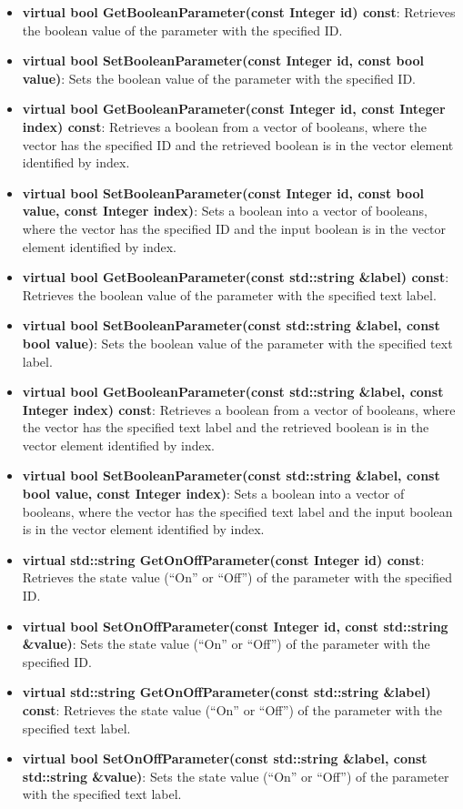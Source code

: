 \begin{itemize}
\item \textbf{virtual bool GetBooleanParameter(const Integer id) const}: Retrieves the boolean value
of the parameter with the specified ID.
\item \textbf{virtual bool SetBooleanParameter(const Integer id, const bool value)}: Sets the
boolean value of the parameter with the specified ID.
\item \textbf{virtual bool GetBooleanParameter(const Integer id, const Integer index) const}:
Retrieves a boolean from a vector of booleans, where the vector has the specified ID and the
retrieved boolean is in the vector element identified by index.
\item \textbf{virtual bool SetBooleanParameter(const Integer id, const bool value, const Integer
index)}: Sets a boolean into a vector of booleans, where the vector has the specified ID and
the input boolean is in the vector element identified by index.
\item \textbf{virtual bool GetBooleanParameter(const std::string \&label) const}: Retrieves the
boolean value of the parameter with the specified text label.
\item \textbf{virtual bool SetBooleanParameter(const std::string \&label, const bool value)}: Sets
the boolean value of the parameter with the specified text label.
\item \textbf{virtual bool GetBooleanParameter(const std::string \&label, const Integer index)
const}: Retrieves a boolean from a vector of booleans, where the vector has the specified text label
and the retrieved boolean is in the vector element identified by index.
\item \textbf{virtual bool SetBooleanParameter(const std::string \&label, const bool value, const
Integer index)}: Sets a boolean into a vector of booleans, where the vector has the specified text
label and the input boolean is in the vector element identified by index.
\item \textbf{virtual std::string GetOnOffParameter(const Integer id) const}: Retrieves the state
value (``On'' or ``Off'') of the parameter with the specified ID.
\item \textbf{virtual bool SetOnOffParameter(const Integer id, const std::string \&value)}: Sets the
state value (``On'' or ``Off'') of the parameter with the specified ID.
\item \textbf{virtual std::string GetOnOffParameter(const std::string \&label) const}: Retrieves the
state value (``On'' or ``Off'') of the parameter with the specified text label.
\item \textbf{virtual bool SetOnOffParameter(const std::string \&label, const std::string
\&value)}: Sets the state value (``On'' or ``Off'') of the parameter with the specified text label.
\end{itemize}

